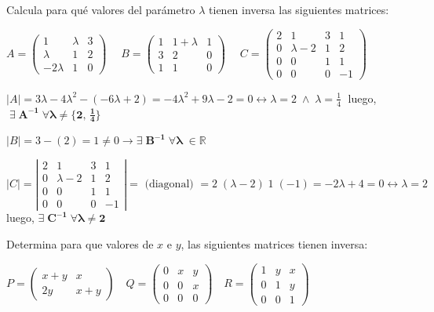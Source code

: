 \begin{ejre}
Calcula para qué valores del parámetro $\lambda$ tienen inversa las siguientes matrices:

\noindent $A = \left( \begin{matrix} 1&\lambda&3\\ \lambda&1&2 \\ -2\lambda &1&0  \end{matrix} \right)\; \quad 
B = \left( \begin{matrix} 1&1+\lambda&1\\3&2&0\\1&1&0  \end{matrix} \right)\; \quad 
C = \left( \begin{matrix} 2&1&3&1\\0& \lambda-2&1&2\\0&0&1&1\\0&0&0&-1  \end{matrix} \right)$

\end{ejre}

\begin{proofw}\renewcommand{\qedsymbol}{$\diamond$}
	
	
\noindent $|A|= 3\lambda -4\lambda^2-(-6\lambda+2)=-4\lambda^2+9\lambda-2=0 \leftrightarrow \lambda=2 \; \wedge \; \lambda=\frac 1 4\; $
luego, $\; \boldsymbol{ \exists \; A^{-1} \; \forall \lambda \neq \{2,\, \frac 1 4\} }$

\noindent $|B|=3-(2)=1\neq 0 \to \boldsymbol{ \exists \; B^{-1} \; \forall \lambda \; \in \mathbb R}$

\noindent $|C|=\left| \begin{matrix} 2&1&3&1\\0& \lambda-2&1&2\\0&0&1&1\\0&0&0&-1  \end{matrix} \right| = \text{ (diagonal) }= 2\;(\lambda-2)\; 1 \; (-1)=-2\lambda+4=0 \leftrightarrow \lambda=2\;$ luego, $\boldsymbol{\exists \; C^{-1} \; \forall \lambda \neq 2}$
\end{proofw}

\begin{ejre}
 Determina para que valores de $x \text{ e } y$, las siguientes matrices tienen inversa:

$ P=\left( \begin{matrix} x+y&x \\2y&x+y   \end{matrix} \right) \quad 
 Q= \left( \begin{matrix} 0&x&y\\0&0&x\\0&0&0  \end{matrix} \right) \quad
 R= \left( \begin{matrix} 1&y&x\\0&1&y\\0&0&1  \end{matrix} \right)$ 

\end{ejre}

